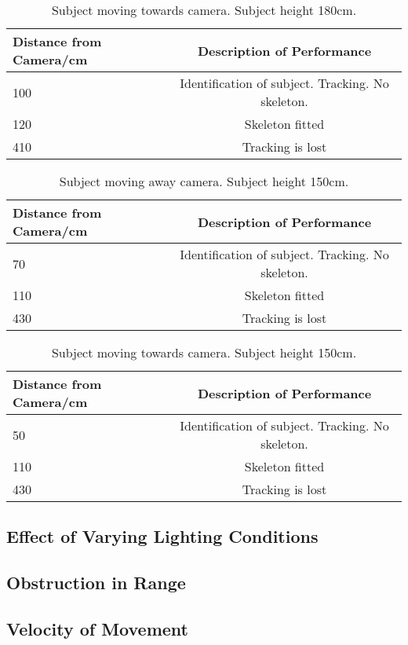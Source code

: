 \documentclass[10pt]{article}
\begin{document}
\begin{table}[h]
\center
\begin{tabular}{ | l | c |}
\hline
Distance from Camera/cm & Description of Performance \\
\hline
100 & Identification of subject. Tracking. No skeleton.\\
120 & Skeleton fitted\\
410 & Tracking is lost\\
\hline
\end{tabular}
\caption{Subject moving towards camera. Subject height 180cm.}
\label{cam_range_180_toward}
\end{table}

\begin{table}[h]
\center
\begin{tabular}{ | l | c |}
\hline
Distance from Camera/cm & Description of Performance \\
\hline
70 & Identification of subject. Tracking. No skeleton.\\
110 & Skeleton fitted\\
430 & Tracking is lost\\
\hline
\end{tabular}
\caption{Subject moving away camera. Subject height 150cm.}
\label{cam_range_150_away}
\end{table}

\begin{table}[h]
\center
\begin{tabular}{ | l | c |}
\hline
Distance from Camera/cm & Description of Performance \\
\hline
50 & Identification of subject. Tracking. No skeleton.\\
110 & Skeleton fitted\\
430 & Tracking is lost\\
\hline
\end{tabular}
\caption{Subject moving towards camera. Subject height 150cm.}
\label{cam_range_150_toward}
\end{table}

\subsection{Effect of Varying Lighting Conditions}
\subsection{Obstruction in Range}
\subsection{Velocity of Movement}
\end{document}
